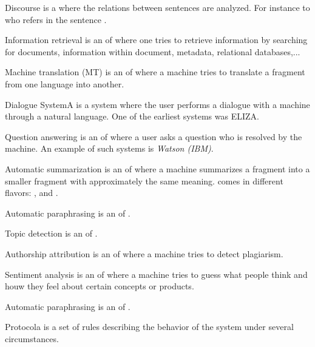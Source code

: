 \documentclass{article}
\begin{document}
\begin{df}{Discourse}\sb{} is a \alnlp{} where the relations between sentences are analyzed. For instance to who refers  in the sentence .
\end{df}
\begin{df}{Information retrieval}\sb{} is an \app{} of \nlp{} where one tries to retrieve information by searching for documents, information within document, metadata, relational databases,...
\end{df}
\begin{df}{Machine translation (MT)}\sb{} is an \app{} of \nlp{} where a machine tries to translate a fragment from one language into another.
\end{df}
\begin{df}{Dialogue System}A \sb{} is a system where the user performs a dialogue with a machine through a natural language. One of the earliest systems was ELIZA.
\end{df}
\begin{df}{Question answering}\sb{} is an \app{} of \nlp{} where a user asks a question who is resolved by the machine. An example of such systems is \emph{Watson (IBM)}.
\end{df}
\begin{df}{Automatic summarization}\sb{} is an \app{} of \nlp{} where a machine summarizes a fragment into a smaller fragment with approximately the same meaning. \sb{} comes in different flavors: ,  and .
\end{df}
\begin{df}{Automatic paraphrasing}\sb{} is an \app{} of \nlp{}.
\end{df}
\begin{df}{Topic detection}\sb{} is an \app{} of \nlp{}.
\end{df}
\begin{df}{Authorship attribution}\sb{} is an \app{} of \nlp{} where a machine tries to detect plagiarism.
\end{df}
\begin{df}{Sentiment analysis}\sb{} is an \app{} of \nlp{} where a machine tries to guess what people think and houw they feel about certain concepts or products.
\end{df}
\begin{df}{Automatic paraphrasing}\sb{} is an \app{} of \nlp{}.
\end{df}
\begin{df}{Protocol}a \sb{} is a set of rules describing the behavior of the system under several circumstances.
\end{df}
\end{document}

